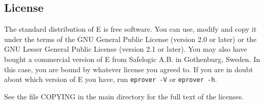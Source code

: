 \documentclass{report}
\begin{document}
\clearpage
\begin{appendix}
  \chapter{License}

  The standard distribution of E is free software. You can use, modify
  and copy it under the terms of the GNU General Public License
  (version 2.0 or later) or the GNU Lesser General Public License
  (version 2.1 or later). You may also have bought a commercial
  version of E from Safelogic A.B. in Gothenburg, Sweden. In this
  case, you are bound by whatever license you agreed to. If you are in
  doubt about which version of E you have, run \texttt{eprover -V} or
  \texttt{eprover -h}.

  See the file COPYING in the main directory for the full text of the
  licenses.
\end{appendix}



\printindex
\end{document}
